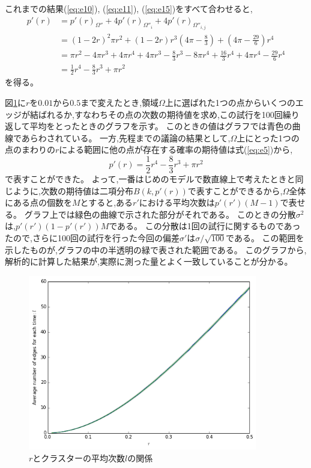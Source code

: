 これまでの結果(\ref{eq:e10}), (\ref{eq:e11}), (\ref{eq:e15})をすべて合わせると,
\begin{align}
p'(r) &= p'(r)_{\Omega''} + 4p'(r)_{\Omega''_{i}} + 4p'(r)_{\Omega''_{i,j}}\nonumber \\
&= (1-2r)^{2}\pi r^{2} + (1-2r)r^{3}\left( 4\pi-\frac{8}{3} \right) + \left(4\pi -\frac{29}{6}\right)r^{4}\nonumber \\
&= \pi r^{2} - 4\pi r^{3} + 4\pi r^{4} + 4\pi r^{3} -\frac{8}{3}r^{3} - 8\pi r^{4} + \frac{16}{3}r^{4} + 4\pi r^{4} - \frac{29}{6}r^{4}\nonumber \\
&= \frac{1}{2}r^{4} -\frac{8}{3}r^{3} + \pi r^{2}
\label{eq:e5}
\end{align}
を得る。

図\ref{fig:f23}に$r$を$0.01$から$0.5$まで変えたとき,領域$\Omega$上に選ばれた1つの点からいくつのエッジが結ばれるか,すなわちその点の次数の期待値を求め,この試行を100回繰り返して平均をとったときのグラフを示す。
このときの値はグラフでは青色の曲線であらわされている。
一方,先程までの議論の結果として,$\Omega$上にとった1つの点のまわりの$r$による範囲に他の点が存在する確率の期待値は式(\ref{eq:e5})から,
\[p'(r) = \frac{1}{2}r^{4} -\frac{8}{3}r^{3} + \pi r^{2}\]
で表すことができた。
よって,一番はじめのモデルで数直線上で考えたときと同じように,次数の期待値は二項分布$B(k,p'(r))$で表すことができるから,$\Omega$全体にある点の個数を$M$とすると,ある$r'$における平均次数は$p'(r')(M-1)$で表せる。
グラフ上では緑色の曲線で示された部分がそれである。
このときの分散$\sigma^{2}$は,$p'(r')(1-p'(r'))M$である。
この分散は1回の試行に関するものであったので,さらに100回の試行を行った今回の偏差$\sigma'$は$\sigma/\sqrt{100}$である。
この範囲を示したものが,グラフの中の半透明の緑で表された範囲である。
このグラフから,解析的に計算した結果が,実際に測った量とよく一致していることが分かる。

\begin{figure}[H]
    \begin{center}
        \includegraphics[width=10cm]{../img/r_l.png}
        \caption{$r$とクラスターの平均次数$l$の関係}
        \label{fig:f23}
    \end{center}
\end{figure}
